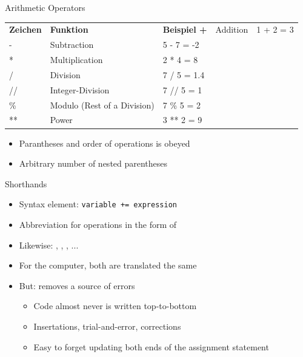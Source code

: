 \begin{frame}{Arithmetic Operators}
%
%
%
\begin{tabularx}
	{\linewidth}
	{OFX}
	\toprule[1.5pt]

	\normalfont	\bfseries Zeichen &
				\bfseries Funktion &
				\bfseries Beispiel
	\tabcrlf
	+  & Addition                    & 1 + 2 = 3 \\
	-  & Subtraction                 & 5 - 7 = -2 \\
	*  & Multiplication              & 2 * 4 = 8 \\
	/  & Division                    & 7 / 5 = 1.4 \\
	// & Integer-Division            & 7 // 5 = 1 \\
	\% & Modulo (Rest of a Division) & 7 \% 5 = 2 \\
	** & Power                       & 3 ** 2 = 9 \\
	
	\bottomrule[1.5pt]	
\end{tabularx}
\begin{itemize}
\item Parantheses and order of operations is obeyed
\item Arbitrary number of nested parentheses
\end{itemize}
%
\end{frame}


\begin{frame}{Shorthands}
%
\begin{itemize}
\item Syntax element: \texttt{variable += expression}
\item Abbreviation for operations in the form of 
\item Likewise: \inPy{-=}, \inPy{*=}, \inPy{/=}, ...
\item For the computer, both are translated the same
\item But: removes a source of errors
	\begin{itemize}
	\item Code almost never is written top-to-bottom
	\item Insertations, trial-and-error, corrections
	\item Easy to forget updating both ends of the assignment statement
	\end{itemize}
\end{itemize}
%
\end{frame}

